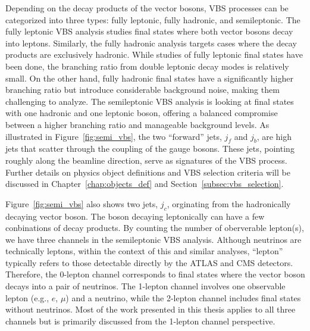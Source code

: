 Depending on the decay products of the vector bosons, VBS processes can be categorized into three types: fully leptonic, fully hadronic, and semileptonic. 
The fully leptonic VBS analysis studies final states where both vector bosons decay into leptons. 
Similarly, the fully hadronic analysis targets cases where the decay products are exclusively hadronic.
While studies of fully leptonic final states have been done, the branching ratio from double leptonic decay modes is relatively small. On the other hand, fully hadronic final states have a significantly higher branching ratio but introduce considerable background noise, making them challenging to analyze.
The semileptonic VBS analysis is looking at final states with one hadronic and one leptonic boson, offering a balanced compromise between a higher branching ratio and manageable background levels. As illustrated in Figure~\ref{fig:semi_vbs}, the two ``forward'' jets, $j_{f}$ and $j_{b}$, are high \pt jets that scatter through the coupling of the gauge bosons. These jets, pointing roughly along the beamline direction, serve as signatures of the VBS process. Further details on physics object definitions and VBS selection criteria will be discussed in Chapter~\ref{chap:objects_def} and Section~\ref{subsec:vbs_selection}.

Figure~\ref{fig:semi_vbs} also shows two jets, $j_{c}$, orginating from the hadronically decaying vector boson. 
The boson decaying leptonically can have a few conbinations of decay products. 
By counting the number of oberverable lepton(s), we have three channels in the semileptonic VBS analysis. 
Although neutrinos are technically leptons, within the context of this and similar analyses, ``lepton'' typically refers to those detectable directly by the ATLAS and CMS detectors.
Therefore, the 0-lepton channel corresponds to final states where the vector boson decays into a pair of neutrinos.
The 1-lepton channel involves one observable lepton (e.g., $e$, $\mu$) and a neutrino, while the 2-lepton channel includes final states without neutrinos. Most of the work presented in this thesis applies to all three channels but is primarily discussed from the 1-lepton channel perspective.



